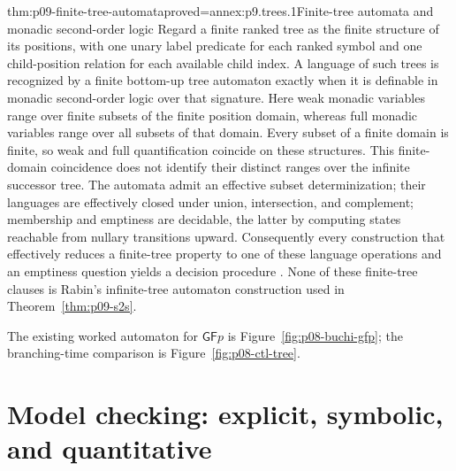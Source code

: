 \begin{hbtheorem}{thm:p09-finite-tree-automata}{proved=annex:p9.trees.1}{Finite-tree automata and monadic second-order logic}
Regard a finite ranked tree as the finite structure of its positions, with one
unary label predicate for each ranked symbol and one child-position relation
for each available child index.  A language of such trees is recognized by a
finite bottom-up tree automaton exactly when it is definable in monadic
second-order logic over that signature.  Here weak monadic variables range over
finite subsets of the finite position domain, whereas full monadic variables
range over all subsets of that domain.  Every subset of a finite domain is
finite, so weak and full quantification coincide on these structures.  This
finite-domain coincidence does not identify their distinct ranges over the
infinite successor tree.
The automata admit an effective subset determinization; their languages are
effectively closed under union, intersection, and complement; membership and
emptiness are decidable, the latter by computing states reachable from nullary
transitions upward.  Consequently every construction that effectively
reduces a finite-tree property to one of these language operations and an
emptiness question yields a decision procedure
\cite{ComonEtAl2007}.  None of these finite-tree clauses is Rabin's
infinite-tree automaton construction used in Theorem~\ref{thm:p09-s2s}.
\end{hbtheorem}

The existing worked automaton for \(\mathsf G\mathsf Fp\) is
Figure~\ref{fig:p08-buchi-gfp}; the branching-time comparison is
Figure~\ref{fig:p08-ctl-tree}.











\section{Model checking: explicit, symbolic, and quantitative}
\label{sec:p09-model-checking}

